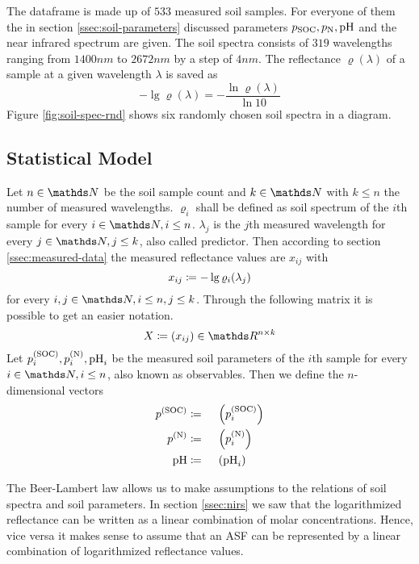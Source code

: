 		\begin{figure*}
			\centering
			
			\caption{This figure shows near infrared soil spectra of six randomly chosen soil samples obtained from the used dataframe.}
			\label{fig:soil-spec-rnd}
		\end{figure*}

		The dataframe is made up of $533$ measured soil samples.
		For everyone of them the in section \ref{ssec:soil-parameters} discussed parameters $p_{\mathrm{SOC}},p_{\mathrm{N}},\mathrm{pH}$ and the near infrared spectrum are given.
		The soil spectra consists of $319$ wavelengths ranging from $1400\unit{nm}$ to $2672\unit{nm}$ by a step of $4\unit{nm}$.
		The reflectance $\varrho(\lambda)$ of a sample at a given wavelength $\lambda$ is saved as
		\[
			-\lg \varrho(\lambda) = -\frac{\ln \varrho(\lambda)}{\ln 10}
		\]
		Figure \ref{fig:soil-spec-rnd} shows six randomly chosen soil spectra in a diagram.
	

	\subsection{Statistical Model}
	\label{ssec:statistical-model}
	
		Let $n\in\SN$ be the soil sample count and $k\in\SN$ with $k\leq n$ the number of measured wavelengths.
		$\varrho_i$ shall be defined as soil spectrum of the $i$th sample for every $i\in\SN,i\leq n$.
		$\lambda_j$ is the $j$th measured wavelength for every $j\in\SN,j\leq k$, also called predictor.
		Then according to section \ref{ssec:measured-data} the measured reflectance values are $x_{ij}$ with
		\[
			x_{ij} \coloneqq -\lg \varrho_i(\lambda_j)
		\]
		for every $i,j\in\SN,i\leq n,j\leq k$.
		Through the following matrix it is possible to get an easier notation.
		\[
			X \define (x_{ij}) \in \SR^{n\times k}
		\]
		Let $p^{\mathrm{(SOC)}}_i, p^{\mathrm{(N)}}_i, \mathrm{pH}_i$ be the measured soil parameters of the $i$th sample for every $i\in\SN,i\leq n$, also known as observables.
		Then we define the $n$-dimensional vectors
		\begin{alignat*}{3}
			p^{\mathrm{(SOC)}} &\coloneqq&&\ \left( p^{\mathrm{(SOC)}}_i \right) \\
			p^{\mathrm{(N)}} &\coloneqq&&\ \left( p^{\mathrm{(N)}}_i \right) \\
			\mathrm{pH} &\coloneqq&&\ \left( \mathrm{pH}_i \right)
		\end{alignat*}

		The Beer-Lambert law allows us to make assumptions to the relations of soil spectra and soil parameters.
		In section \ref{ssec:nirs} we saw that the logarithmized reflectance can be written as a linear combination of molar concentrations.
		Hence, vice versa it makes sense to assume that an ASF can be represented by a linear combination of logarithmized reflectance values.

